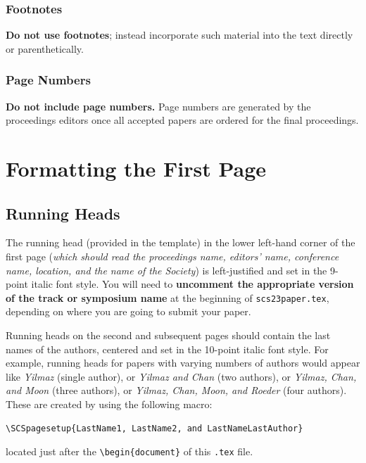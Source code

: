 \documentclass{scspaperproc}
\theoremstyle{scsthe}
\begin{document}
    \subsubsection{Footnotes}
    \textbf{Do not use footnotes}; instead incorporate such material into the text directly or parenthetically.

    \subsubsection{Page Numbers}
    \textbf{Do not include page numbers.} Page numbers are generated by the proceedings editors once all accepted papers are ordered for the final proceedings.


    \section{Formatting the First Page}

    \subsection{Running Heads}
    The running head (provided in the template) in the lower left-hand corner of the first page (\textit{which should read the proceedings name, editors' name, conference name, location, and the name of the Society}) is left-justified and set in the 9-point italic font style. %
    You will need to \textbf{uncomment the appropriate version of the track or symposium name} at the beginning of \texttt{scs23paper.tex}, depending on where you are going to submit your paper.

    Running heads on the second and subsequent pages should contain the last names of the authors, centered and set in the 10-point italic font style. For example, running heads for papers with varying numbers of authors would appear like \emph{Yilmaz} (single author), or \emph{Yilmaz and Chan} (two authors), or \emph{Yilmaz, Chan, and Moon} (three authors), or \emph{Yilmaz, Chan, Moon, and Roeder} (four authors). These are created by using the following macro:

    \noindent \begin{verbatim}
\SCSpagesetup{LastName1, LastName2, and LastNameLastAuthor}
    \end{verbatim}

    located just after the \verb+\begin{document}+ of this \texttt{.tex} file.
\end{document}
